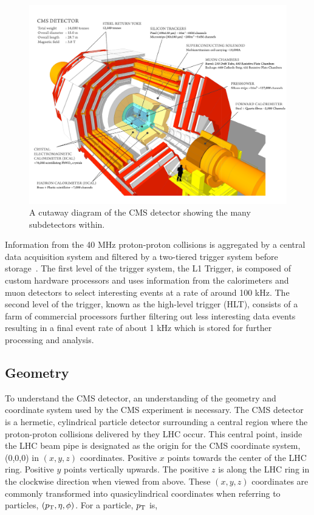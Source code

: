 \begin{figure}[htbp]
\centering
     \includegraphics[width=1.0\textwidth]{cms_and_lhc/plots/cms_detector.pdf}
     \caption{
A cutaway diagram of the CMS detector showing the many subdetectors within.
     }
     \label{fig:cms_detector}
\end{figure}

Information from the 40 MHz proton-proton collisions is aggregated by a central data acquisition system
and filtered by a two-tiered trigger system before storage~\cite{Khachatryan:2016bia}. 
The first level of the trigger system, the L1 Trigger, is composed of custom hardware processors and uses information 
from the calorimeters and muon detectors to select interesting events at a rate of around 100 kHz. The second level of
the trigger, known as the high-level trigger (HLT), consists of a farm of commercial processors further
filtering out less interesting data events resulting in a final event rate of about 1 kHz which is stored
for further processing and analysis.



\subsection{Geometry}
To understand the CMS detector, an understanding of the geometry and coordinate system used by the 
CMS experiment is necessary. The CMS detector is a hermetic, cylindrical particle detector surrounding
a central region where the proton-proton collisions delivered by they LHC occur. This central
point, inside the LHC beam pipe is designated as the origin for the CMS coordinate system, (0,0,0) in
$(x, y, z)$ coordinates. Positive $x$ points towards the center of the LHC ring.
Positive $y$ points vertically upwards. The positive $z$ is along the LHC ring in the
clockwise direction when viewed from above. These $(x, y, z)$ coordinates are commonly transformed
into quasicylindrical coordinates when referring to particles, $(p_\mathrm{T}, \eta, \phi)$. For a particle,
$p_\mathrm{T}$ is,

